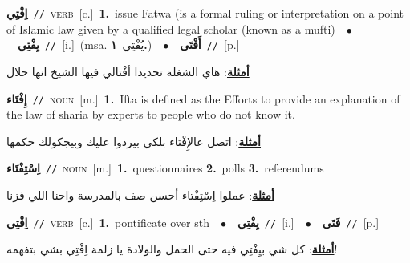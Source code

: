 \documentclass[10pt,a4paper,twoside]{article} %
\begin{document}
\begin{multicols}{2}
{{{{{{{{\setlength\topsep{0pt}\textbf{\foreignlanguage{arabic}{اِفْتِي}}\ {\color{gray}\texttt{//}\color{black}}\ \textsc{verb}\ [c.]\ \textbf{1.}~issue Fatwa (is a formal ruling or interpretation on a point of Islamic law given by a qualified legal scholar (known as a mufti)\ \ $\bullet$\ \ \setlength\topsep{0pt}\textbf{\foreignlanguage{arabic}{يِفْتِي}}\ {\color{gray}\texttt{//}\color{black}}\ [i.]\ \color{gray}(msa. \foreignlanguage{arabic}{يُفْتِي}~\foreignlanguage{arabic}{\textbf{١.}})\color{black}\ \ $\bullet$\ \ \setlength\topsep{0pt}\textbf{\foreignlanguage{arabic}{أَفْتَى}}\ {\color{gray}\texttt{//}\color{black}}\ [p.]\  \begin{flushright}\color{gray}\foreignlanguage{arabic}{\textbf{\underline{\foreignlanguage{arabic}{أمثلة}}}: هاي الشغلة تحديدا أفْتالي فيها الشيخ انها حلال}\end{flushright}\color{black}} \vspace{2mm}

{\setlength\topsep{0pt}\textbf{\foreignlanguage{arabic}{إِفْتَاء}}\ {\color{gray}\texttt{//}\color{black}}\ \textsc{noun}\ [m.]\ \textbf{1.}~Ifta is defined as the Efforts to provide an explanation of the law of sharia by experts to people who do not know it.\  \begin{flushright}\color{gray}\foreignlanguage{arabic}{\textbf{\underline{\foreignlanguage{arabic}{أمثلة}}}: اتصل عالإِفْتاء بلكي بيردوا عليك وبيجكولك حكمها}\end{flushright}\color{black}} \vspace{2mm}

{\setlength\topsep{0pt}\textbf{\foreignlanguage{arabic}{اِسْتِفْتَاء}}\ {\color{gray}\texttt{//}\color{black}}\ \textsc{noun}\ [m.]\ \textbf{1.}~questionnaires  \textbf{2.}~polls  \textbf{3.}~referendums\  \begin{flushright}\color{gray}\foreignlanguage{arabic}{\textbf{\underline{\foreignlanguage{arabic}{أمثلة}}}: عملوا اِسْتِفْتاء أحسن صف بالمدرسة واحنا اللي فزنا}\end{flushright}\color{black}} \vspace{2mm}

{\setlength\topsep{0pt}\textbf{\foreignlanguage{arabic}{اِفْتِي}}\ {\color{gray}\texttt{//}\color{black}}\ \textsc{verb}\ [c.]\ \textbf{1.}~pontificate over sth\ \ $\bullet$\ \ \setlength\topsep{0pt}\textbf{\foreignlanguage{arabic}{يِفْتِي}}\ {\color{gray}\texttt{//}\color{black}}\ [i.]\ \ $\bullet$\ \ \setlength\topsep{0pt}\textbf{\foreignlanguage{arabic}{فَتَى}}\ {\color{gray}\texttt{//}\color{black}}\ [p.]\  \begin{flushright}\color{gray}\foreignlanguage{arabic}{\textbf{\underline{\foreignlanguage{arabic}{أمثلة}}}: كل شي بيِفْتِي فيه حتى الحمل والولادة يا زلمة اِفْتِي بشي بتفهمه!}\end{flushright}\color{black}} \vspace{2mm}

}}}}}}}
\end{multicols}
\end{document}
